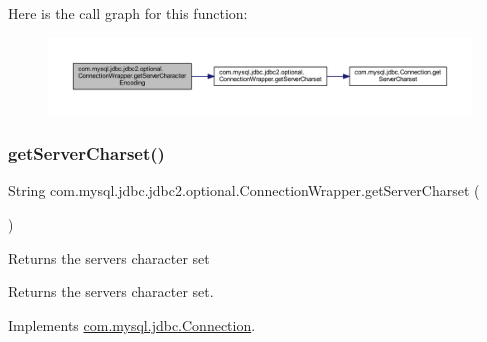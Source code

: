 Here is the call graph for this function\+:
\nopagebreak
\begin{figure}[H]
\begin{center}
\leavevmode
\includegraphics[width=350pt]{classcom_1_1mysql_1_1jdbc_1_1jdbc2_1_1optional_1_1_connection_wrapper_a2426ec0276a9fe98270a545d0c272546_cgraph}
\end{center}
\end{figure}
\mbox{\label{classcom_1_1mysql_1_1jdbc_1_1jdbc2_1_1optional_1_1_connection_wrapper_a1ef2f18c2e33a44c97b764a50fda2da4}} 
\subsubsection{\texorpdfstring{get\+Server\+Charset()}{getServerCharset()}}
{\footnotesize\ttfamily String com.\+mysql.\+jdbc.\+jdbc2.\+optional.\+Connection\+Wrapper.\+get\+Server\+Charset (\begin{DoxyParamCaption}{ }\end{DoxyParamCaption})}

Returns the server\textquotesingle{}s character set

\begin{DoxyReturn}{Returns}
the server\textquotesingle{}s character set. 
\end{DoxyReturn}


Implements \mbox{\hyperlink{interfacecom_1_1mysql_1_1jdbc_1_1_connection_a1831e47e0daa7d5a4b362219105a85ec}{com.\+mysql.\+jdbc.\+Connection}}.

